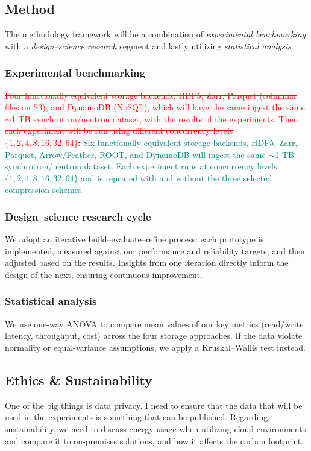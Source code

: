 \documentclass{article}
\begin{document}
\subsection{Method}
The methodology framework will be a combination of \emph{experimental benchmarking} with a \emph{design–science research} segment and lastly utilizing \emph{statistical analysis}.

\subsubsection{Experimental benchmarking}
\textcolor{red}{\sout{Four functionally equivalent storage backends, HDF5, Zarr, Parquet (columnar files on S3), and DynamoDB (NoSQL), which will have the same ingest the same $\sim$1 TB synchrotron/neutron dataset, with the results of the experiments. Then each experiment will be run using different concurrency levels $\{1,2,4,8,16,32,64\}$.}}
\textcolor{teal}{Six functionally equivalent storage backends, HDF5, Zarr, Parquet, Arrow/Feather, ROOT, and DynamoDB will ingest the same $\sim$1 TB synchrotron/neutron dataset. Each experiment runs at concurrency levels $\{1,2,4,8,16,32,64\}$ and is repeated with and without the three selected compression schemes.}


\subsubsection{Design–science research cycle}
We adopt an iterative build–evaluate–refine process: each prototype is implemented, measured against our performance and reliability targets, and then adjusted based on the results. Insights from one iteration directly inform the design of the next, ensuring continuous improvement.

\subsubsection{Statistical analysis}
We use one-way ANOVA to compare mean values of our key metrics (read/write latency, throughput, cost) across the four storage approaches. If the data violate normality or equal-variance assumptions, we apply a Kruskal–Wallis test instead.



\subsection{Ethics \& Sustainability}
One of the big things is data privacy. I need to ensure that the data that will be used in the experiments is something that can be published. Regarding sustainability, we need to discuss energy usage when utilizing cloud environments and compare it to on-premises solutions, and how it affects the carbon footprint.
\end{document}
